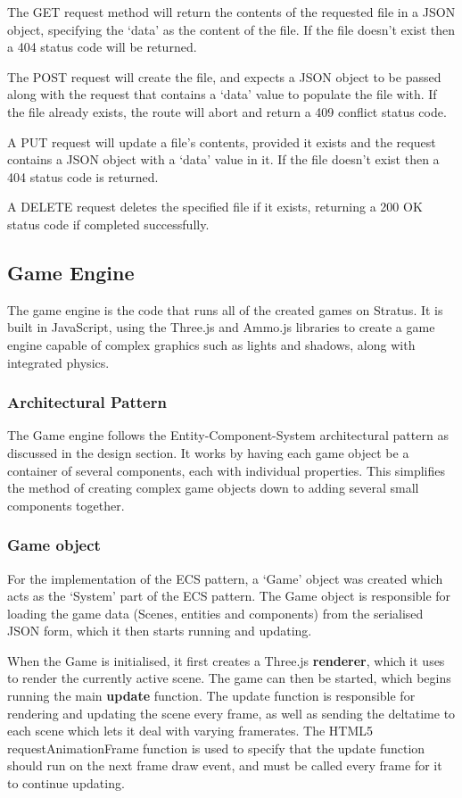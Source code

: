 	The GET request method will return the contents of the requested file in a JSON object, specifying the `data' as the content of the file. If the file doesn't exist then a 404 status code will be returned.

	The POST request will create the file, and expects a JSON object to be passed along with the request that contains a `data' value to populate the file with. If the file already exists, the route will abort and return a 409 conflict status code.

	A PUT request will update a file's contents, provided it exists and the request contains a JSON object with a `data' value in it. If the file doesn't exist then a 404 status code is returned.

	A DELETE request deletes the specified file if it exists, returning a 200 OK status code if completed successfully.

	\subsection{Game Engine}
	The game engine is the code that runs all of the created games on Stratus. It is built in JavaScript, using the Three.js and Ammo.js libraries to create a game engine capable of complex graphics such as lights and shadows, along with integrated physics.

	\subsubsection{Architectural Pattern}
	The Game engine follows the Entity-Component-System architectural pattern as discussed in the design section. It works by having each game object be a container of several components, each with individual properties. This simplifies the method of creating complex game objects down to adding several small components together.

	\subsubsection{Game object}
	For the implementation of the ECS pattern, a `Game' object was created which acts as the `System' part of the ECS pattern. The Game object is responsible for loading the game data (Scenes, entities and components) from the serialised JSON form, which it then starts running and updating. 

	When the Game is initialised, it first creates a Three.js \textbf{renderer}, which it uses to render the currently active scene. The game can then be started, which begins running the main \textbf{update} function. The update function is responsible for rendering and updating the scene every frame, as well as sending the deltatime to each scene which lets it deal with varying framerates. The HTML5 requestAnimationFrame function is used to specify that the update function should run on the next frame draw event, and must be called every frame for it to continue updating.

